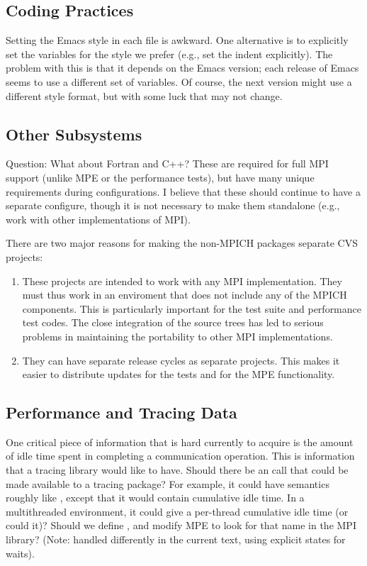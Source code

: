 \documentclass{article}
\begin{document}
\subsection{Coding Practices}
Setting the Emacs style in each file is awkward.
One alternative is to explicitly set the variables for the style we prefer
(e.g., set the indent explicitly).  The problem with this is that it depends
on the Emacs version; each release of Emacs seems to use a different set of
variables.  Of course, the next version might use a different style format,
but with some luck that may not change.


\subsection{Other Subsystems}
Question: What about Fortran and C++?  These are required for full MPI support
(unlike MPE or the performance tests), but have many unique requirements
during configurations.  I believe that these should continue to have a
separate configure, though it is not necessary to make them standalone (e.g.,
work with other implementations of MPI).

There are two major reasons for making the non-MPICH packages separate CVS
projects:
\begin{enumerate}
\item These projects are intended to work with any MPI implementation.  They
  must thus work in an enviroment that does not include any of the MPICH
  components.  This is particularly important for the test suite and
  performance test codes.  The close integration of the source trees has led
  to serious problems in maintaining the portability to other MPI
  implementations.  
\item They can have separate release cycles as separate projects.  This makes
  it easier to distribute updates for the tests and for the MPE functionality.
\end{enumerate}


\subsection{Performance and Tracing Data}
\label{sec:tracing}

One critical piece of information that is hard currently to acquire is
the amount of idle time spent in completing a communication operation.
This is information that a tracing library would like to have.  Should
there be an  call that could be made available to a tracing
package?  For example, it could have semantics roughly like
, except that it would contain cumulative idle time.  In a
multithreaded environment, it could give a per-thread cumulative idle
time (or could it)?  Should we define , and modify MPE
to look for that name in the MPI library? (Note: handled differently in the
current text, using explicit states for waits).
\end{document}
